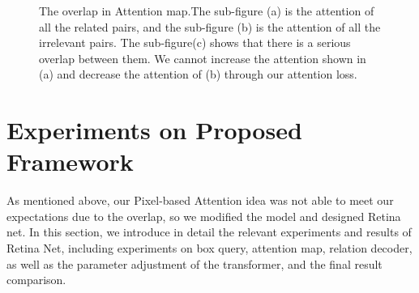 \begin{figure}[tbph!]
{\begin{minipage}[t]{5cm}
			\label{fig:motor_all1}
	\end{minipage}}
	
	\caption[The overlap in Attention map]{The overlap in Attention map.The sub-figure (a) is the attention of all the related pairs, and the sub-figure (b) is the attention of all the irrelevant pairs. The sub-figure(c) shows that there is a serious overlap between them. We cannot increase the attention shown in (a) and decrease the attention of (b) through our attention loss.}
	\label{fig:overlap}
\end{figure}



\section{Experiments on Proposed Framework}

As mentioned above, our Pixel-based Attention idea was not able to meet our expectations due to the overlap, so we modified the model and designed Retina net.  
In this section, we introduce in detail the relevant experiments and results of Retina Net, including experiments on box query, attention map, relation decoder, as well as the parameter adjustment of the transformer, and the final result comparison.

